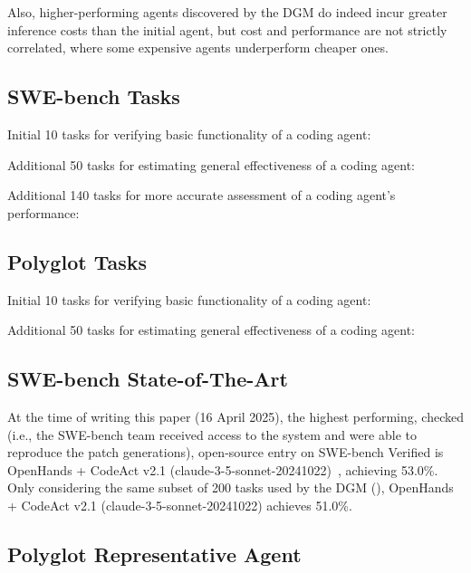 Also, higher-performing agents discovered by the DGM do indeed incur greater inference costs than the initial agent, but cost and performance are not strictly correlated, where some expensive agents underperform cheaper ones.

\subsection{SWE-bench Tasks}
\label{app:swebench-tasks}

Initial 10 tasks for verifying basic functionality of a coding agent:


Additional 50 tasks for estimating general effectiveness of a coding agent:


Additional 140 tasks for more accurate assessment of a coding agent's performance:


\subsection{Polyglot Tasks}
\label{app:polyglot-tasks}

Initial 10 tasks for verifying basic functionality of a coding agent:


Additional 50 tasks for estimating general effectiveness of a coding agent:


\subsection{SWE-bench State-of-The-Art}
\label{app:swebench-sota}
At the time of writing this paper (16 April 2025), the highest performing, checked (i.e., the SWE-bench team received access to the system and were able to reproduce the patch generations), open-source entry on SWE-bench Verified is OpenHands + CodeAct v2.1 (claude-3-5-sonnet-20241022)~\citep{wang2024openhands}, achieving 53.0\%. Only considering the same subset of 200 tasks used by the DGM (), OpenHands + CodeAct v2.1 (claude-3-5-sonnet-20241022) achieves 51.0\%.

\subsection{Polyglot Representative Agent}
\label{app:polyglot-sota}

